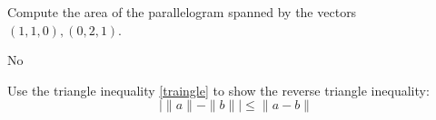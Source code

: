 \documentclass[openany]{book}
\begin{document}

\begin{prob}
    Compute the area of the parallelogram spanned by the vectors $(1,1,0), (0,2,1)$.
\end{prob}
No

\newpage
\begin{prob}
    Use the triangle inequality \ref{traingle} to show the reverse triangle inequality:
    \begin{equation*}
        \bigg|\|a\|-\|b\|\bigg|\leq\|a-b\|
    \end{equation*}
\end{prob}
\newpage
\end{document}
